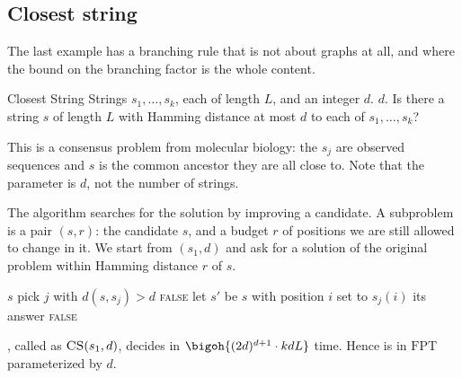 \subsection{Closest string}

The last example has a branching rule that is not about graphs at all, and where
the bound on the branching factor is the whole content.

\begin{probdef}{Closest String}
  \instance Strings $s_1, \ldots, s_k$, each of length $L$, and an integer $d$.
  \parameter $d$.
  \question Is there a string $s$ of length $L$ with Hamming distance at most
  $d$ to each of $s_1, \ldots, s_k$?
\end{probdef}

This is a consensus problem from molecular biology: the $s_j$ are observed
sequences and $s$ is the common ancestor they are all close to. Note that the
parameter is $d$, not the number of strings.

The algorithm searches for the solution by improving a candidate. A subproblem
is a pair $(s, r)$: the candidate $s$, and a budget $r$ of positions we are
still allowed to change in it. We start from $(s_1, d)$ and ask for a solution
of the original problem within Hamming distance $r$ of $s$.

\begin{algorithm}[ht]
\caption{Branching for }
\label{alg:fpt-closest-string}
\begin{algorithmic}[1]
     \Return $s$ \EndIf
    \State pick $j$ with $d(s,s_j) > d$
     \Return \textsc{false} \EndIf
      \State let $s'$ be $s$ with position $i$ set to $s_j(i)$
       \Return its answer \EndIf
    \EndFor
    \State \Return \textsc{false}
  \EndFunction
\end{algorithmic}
\end{algorithm}

\begin{theorem}\label{thm:fpt-closest-string}
, called as $\textsc{CS}(s_1, d)$, decides
 in $\bigoh{(2d)^{d+1} \cdot kdL}$ time. Hence
 is in $\mathrm{FPT}$ parameterized by $d$.
\end{theorem}

